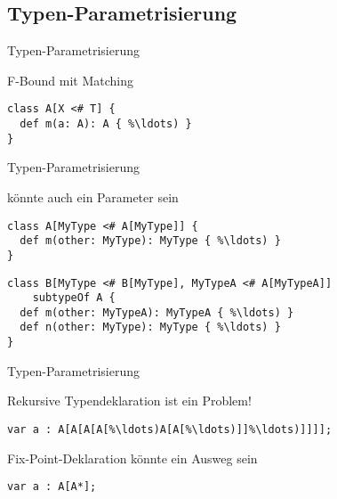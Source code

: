 \subsection{Typen-Parametrisierung}
\begin{frame}[t,fragile]{Typen-Parametrisierung}
	\begin{bigitemize}{3mm}
		\item F-Bound mit Matching
	\end{bigitemize}
\pause
\begin{lstlisting}[language=ooplss]
class A[X <# T] {
  def m(a: A): A { %\ldots) }
}
\end{lstlisting}
\end{frame}

\begin{frame}[t,fragile]{Typen-Parametrisierung}
	\begin{bigitemize}{3mm}
		\item \mytype könnte auch ein Parameter sein
	\end{bigitemize}
\pause
\begin{lstlisting}[language=ooplss]
class A[MyType <# A[MyType]] {
  def m(other: MyType): MyType { %\ldots) }
}
\end{lstlisting}
\pause
\begin{lstlisting}[language=ooplss]
class B[MyType <# B[MyType], MyTypeA <# A[MyTypeA]]
    subtypeOf A {
  def m(other: MyTypeA): MyTypeA { %\ldots) }
  def n(other: MyType): MyType { %\ldots) }
}
\end{lstlisting}
\end{frame}

\begin{frame}[t,fragile]{Typen-Parametrisierung}
	\begin{bigitemize}{3mm}
		\item Rekursive Typendeklaration ist ein Problem!
	\end{bigitemize}
\pause
\begin{lstlisting}[language=ooplss]
var a : A[A[A[A[%\ldots)A[A[%\ldots)]]%\ldots)]]]];
\end{lstlisting}
\pause

	\begin{bigitemize}{3mm}
		\item Fix-Point-Deklaration könnte ein Ausweg sein
	\end{bigitemize}
\pause
\begin{lstlisting}[language=ooplss]
var a : A[A*];
\end{lstlisting}
\end{frame}

